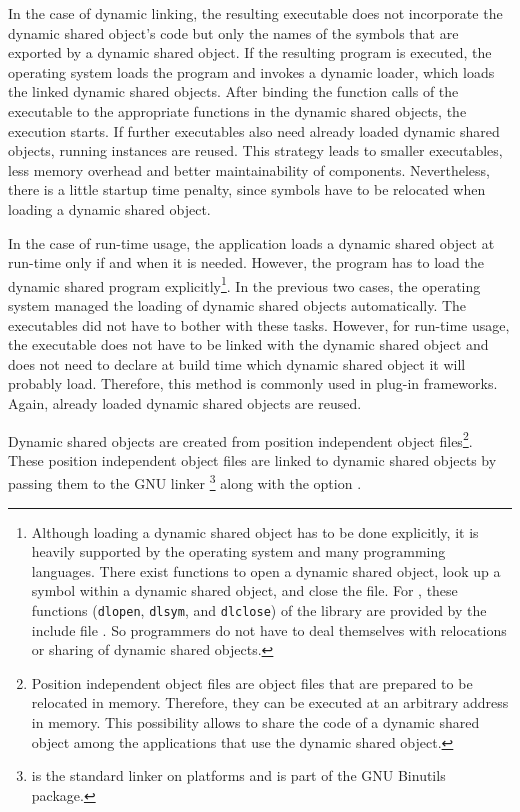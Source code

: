 In the case of dynamic linking, the resulting executable does not incorporate the dynamic shared object's code but only the names of the symbols that are exported by a dynamic shared object. If the resulting program is executed, the operating system loads the program and invokes a dynamic loader, which loads the linked dynamic shared objects. After binding the function calls of the executable to the appropriate functions in the dynamic shared objects, the execution starts. If further executables also need already loaded dynamic shared objects, running instances are reused. This strategy leads to smaller executables, less memory overhead and better maintainability of components. Nevertheless, there is a little startup time penalty, since symbols have to be relocated when loading a dynamic shared object. 

In the case of run-time usage, the application loads a dynamic shared object at run-time only if and when it is needed. However, the program has to load the dynamic shared program explicitly\footnote{Although loading a dynamic shared object has to be done explicitly, it is heavily supported by the operating system and many programming languages. There exist functions to open a dynamic shared object, look up a symbol within a dynamic shared object, and close the file. For \C, these functions ({\tt dlopen}, {\tt dlsym}, and {\tt dlclose}) of the  library are provided by the include file . So programmers do not have to deal themselves with relocations or sharing of dynamic shared objects.}. In the previous two cases, the operating system managed the loading of dynamic shared objects automatically. The executables did not have to bother with these tasks. However, for run-time usage, the executable does not have to be linked with the dynamic shared object and does not need to declare at build time which dynamic shared object it will probably load. Therefore, this method is commonly used in plug-in frameworks. Again, already loaded dynamic shared objects are reused.

Dynamic shared objects are created from position independent object files\footnote{Position independent object files are object files that are prepared to be relocated in memory. Therefore, they can be executed at an arbitrary address in memory. This possibility allows to share the code of a dynamic shared object among the applications that use the dynamic shared object.}. These position independent object files are linked to dynamic shared objects by passing them to the GNU linker \Ld{}\footnote{\Ld is the standard linker on \GNULinux platforms and is part of the GNU Binutils package\cite{GNUBinutils}.} along with the option .

